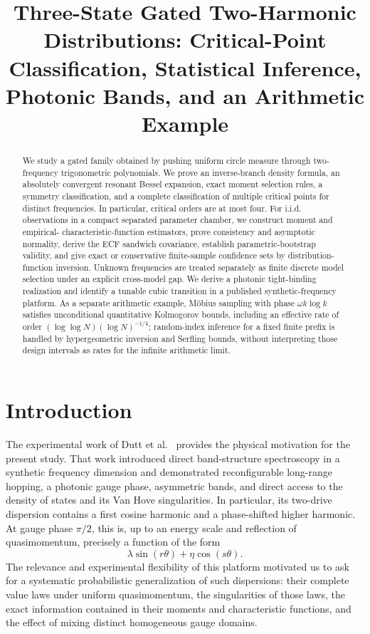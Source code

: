 \documentclass[11pt]{amsart}
\title[Three-State Gated Two-Harmonic Distributions]{Three-State Gated Two-Harmonic Distributions: Critical-Point Classification, Statistical Inference, Photonic Bands, and an Arithmetic Example}
\author{}\date{}
\numberwithin{equation}{section}\setcounter{tocdepth}{3}\setcounter{secnumdepth}{3}
\begin{document}
\begin{abstract}
We study a gated family obtained by pushing uniform circle measure through two-frequency
trigonometric polynomials.  We prove an inverse-branch density formula, an absolutely
convergent resonant Bessel expansion, exact moment selection rules, a symmetry
classification, and a complete classification of multiple critical points for distinct
frequencies.  In particular, critical orders are at most four.  For i.i.d. observations
in a compact separated parameter chamber, we construct moment and empirical-
characteristic-function estimators, prove consistency and asymptotic normality, derive
the ECF sandwich covariance, establish parametric-bootstrap validity, and give exact or
conservative finite-sample confidence sets by distribution-function inversion.  Unknown
frequencies are treated separately as finite discrete model selection under an explicit
cross-model gap.  We derive a photonic tight-binding realization and identify a tunable
cubic transition in a published synthetic-frequency platform.  As a separate arithmetic
example, Möbius sampling with phase $\omega k\log k$ satisfies unconditional
quantitative Kolmogorov bounds, including an effective rate of order
$(\log\log N)(\log N)^{-1/4}$; random-index inference for a fixed finite prefix is
handled by hypergeometric inversion and Serfling bounds, without interpreting those
design intervals as rates for the infinite arithmetic limit.
\end{abstract}
\maketitle
\tableofcontents
\section{Introduction}\label{sec:introduction}
The experimental work of Dutt et al.\ \cite{DuttEtAl2019} provides the physical
motivation for the present study.  That work introduced direct band-structure
spectroscopy in a synthetic frequency dimension and demonstrated reconfigurable
long-range hopping, a photonic gauge phase, asymmetric bands, and direct access to the
density of states and its Van Hove singularities.  In particular, its two-drive
dispersion contains a first cosine harmonic and a phase-shifted higher harmonic.  At
gauge phase $\pi/2$, this is, up to an energy scale and reflection of quasimomentum,
precisely a function of the form
\begin{equation}
 \lambda\sin(r\theta)+\eta\cos(s\theta).
\label{eq:intro_two_harmonic}
\end{equation}
The relevance and experimental flexibility of this platform motivated us to ask for a
systematic probabilistic generalization of such dispersions: their complete value laws
under uniform quasimomentum, the singularities of those laws, the exact information
contained in their moments and characteristic functions, and the effect of mixing
distinct homogeneous gauge domains.
\end{document}
